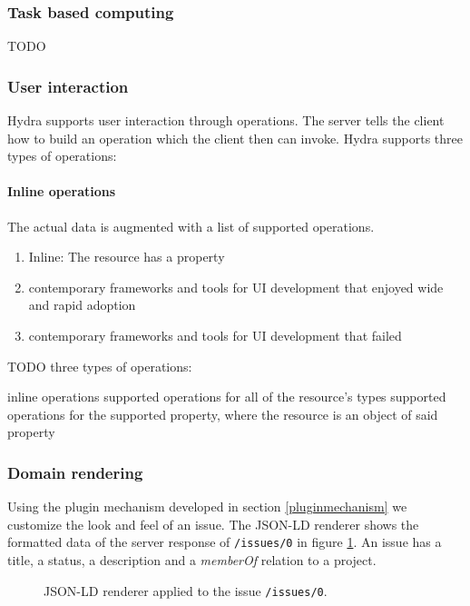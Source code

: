 \subsubsection{Task based computing}

TODO

\subsubsection{User interaction}
Hydra supports user interaction through operations. The server tells the client how to build an operation which the client then can invoke. Hydra supports three types of operations:

\paragraph{Inline operations}
The actual data is augmented with a list of supported operations.
\begin{enumerate}
  \item Inline: The resource has a property
  \item contemporary frameworks and tools for UI development that enjoyed wide and rapid adoption
  \item contemporary frameworks and tools for UI development that failed
\end{enumerate}

TODO three types of operations:

inline operations
supported operations for all of the resource's types
supported operations for the supported property, where the resource is an object of said property

\subsubsection{Domain rendering}
Using the plugin mechanism developed in section \ref{pluginmechanism} we customize the look and feel of an issue. The JSON-LD renderer shows the formatted data of the server response of \lstinline{/issues/0} in figure \ref{fig:issue}. An issue has a title, a status, a description and a \textit{memberOf} relation to a project.

\begin{figure}[!htb]
  \caption{JSON-LD renderer applied to the issue \lstinline{/issues/0}.}
  \label{fig:issue}
\end{figure}

